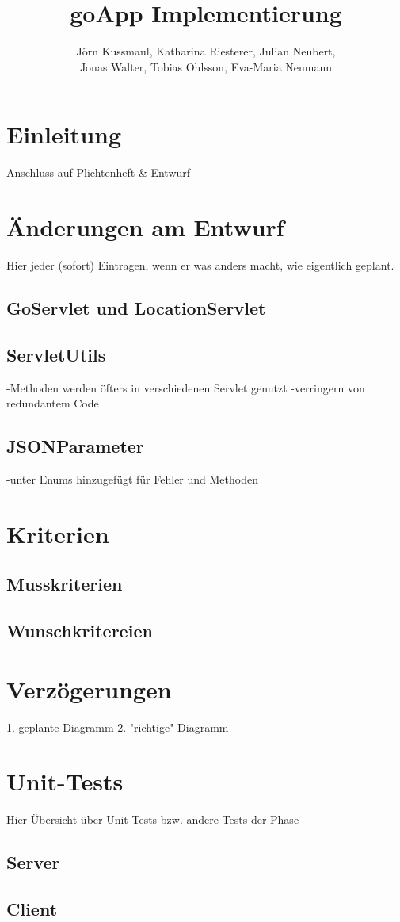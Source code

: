 \documentclass{scrartcl}
\title{goApp Implementierung}
\author{Jörn Kussmaul, Katharina Riesterer, Julian Neubert,\\ Jonas Walter, Tobias Ohlsson, Eva-Maria Neumann}
\begin{document}
	\maketitle
	\newpage
	\tableofcontents
	\newpage

	\section{Einleitung}
	Anschluss auf Plichtenheft \& Entwurf
	
	\newpage
	\section{Änderungen am Entwurf}
	Hier jeder (sofort) Eintragen, wenn er was anders macht, wie eigentlich geplant.
	
	\subsection{GoServlet und LocationServlet}
	
	\subsection{ServletUtils}
	-Methoden werden öfters in verschiedenen Servlet genutzt
	-verringern von redundantem Code
	
	\subsection{JSONParameter}
	-unter Enums hinzugefügt für Fehler und Methoden
	\newpage
	\section{Kriterien}
	\subsection{Musskriterien}
	\subsection{Wunschkritereien}
	
	\newpage
	\section{Verzögerungen}
	1. geplante Diagramm
	2. "richtige" Diagramm
	
	\newpage
	\section{Unit-Tests}
	Hier Übersicht über Unit-Tests bzw. andere Tests der Phase
	\subsection{Server}
	\subsection{Client}
	
\end{document}

